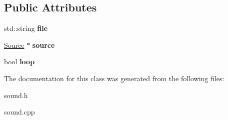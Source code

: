 \subsection*{Public Attributes}
\begin{DoxyCompactItemize}
\item 
\hypertarget{classg2c_1_1_sound_af23aa2ffa02023222953da2f6f3fa67c}{
std::string {\bfseries file}}
\label{classg2c_1_1_sound_af23aa2ffa02023222953da2f6f3fa67c}

\item 
\hypertarget{classg2c_1_1_sound_ab934f09627fbfa470405cf64b3f963a8}{
\hyperlink{classg2c_1_1_source}{Source} $\ast$ {\bfseries source}}
\label{classg2c_1_1_sound_ab934f09627fbfa470405cf64b3f963a8}

\item 
\hypertarget{classg2c_1_1_sound_a275c745fd1970d2da1cf5a5facf967f0}{
bool {\bfseries loop}}
\label{classg2c_1_1_sound_a275c745fd1970d2da1cf5a5facf967f0}

\end{DoxyCompactItemize}


The documentation for this class was generated from the following files:\begin{DoxyCompactItemize}
\item 
sound.h\item 
sound.cpp\end{DoxyCompactItemize}
